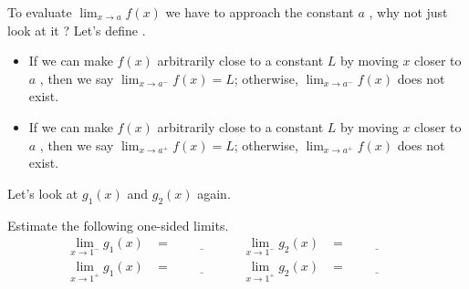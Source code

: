 \documentclass[../main.tex]{subfiles}
\begin{document}
  To evaluate \(\lim_{x \to a} f(x)\) we have to approach the constant \(a\) , why not just look at it ?  Let's define .
  \begin{itemize}
    \item If we can make \(f(x)\) arbitrarily close to a constant \(L\) by moving \(x\) closer to \(a\) , then we say \(\lim_{x \to a^{-}} f(x) = L\); otherwise, \(\lim_{x \to a^{-}} f(x)\) does not exist.
  
    \item If we can make \(f(x)\) arbitrarily close to a constant \(L\) by moving \(x\) closer to \(a\) , then we say \(\lim_{x \to a^{+}} f(x) = L\); otherwise, \(\lim_{x \to a^{+}} f(x)\) does not exist.
  \end{itemize}
  
  \begin{example}
    Let's look at \(g_{1}(x)\) and \(g_{2}(x)\) again.

    \begin{center}
      \hspace{1in}
    \end{center}

    Estimate the following one-sided limits.
    \begin{align*}
      \lim_{x \to 1^{-}} g_{1}(x) 
      &= \underline{\hspace{2cm}}
      & \lim_{x \to 1^{-}} g_{2}(x) 
      &= \underline{\hspace{2cm}} \\[2ex]
      \lim_{x \to 1^{+}} g_{1}(x) 
      &= \underline{\hspace{2cm}}
      & \lim_{x \to 1^{+}} g_{2}(x) 
      &= \underline{\hspace{2cm}}
    \end{align*}
  \end{example}
  
\end{document}
